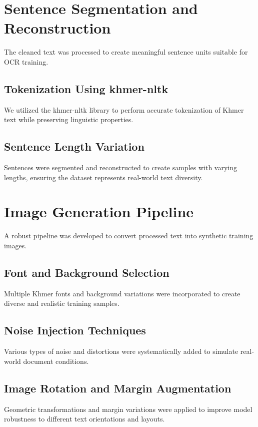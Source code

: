\section{Sentence Segmentation and Reconstruction}
\label{sec:segmentation}
The cleaned text was processed to create meaningful sentence units suitable for OCR training.

\subsection{Tokenization Using khmer-nltk}
\label{subsec:tokenization}
We utilized the khmer-nltk library to perform accurate tokenization of Khmer text while preserving linguistic properties.

\subsection{Sentence Length Variation}
\label{subsec:length}
Sentences were segmented and reconstructed to create samples with varying lengths, ensuring the dataset represents real-world text diversity.

\section{Image Generation Pipeline}
\label{sec:generation}
A robust pipeline was developed to convert processed text into synthetic training images.

\subsection{Font and Background Selection}
\label{subsec:fonts}
Multiple Khmer fonts and background variations were incorporated to create diverse and realistic training samples.

\subsection{Noise Injection Techniques}
\label{subsec:noise}
Various types of noise and distortions were systematically added to simulate real-world document conditions.

\subsection{Image Rotation and Margin Augmentation}
\label{subsec:augmentation}
Geometric transformations and margin variations were applied to improve model robustness to different text orientations and layouts.

